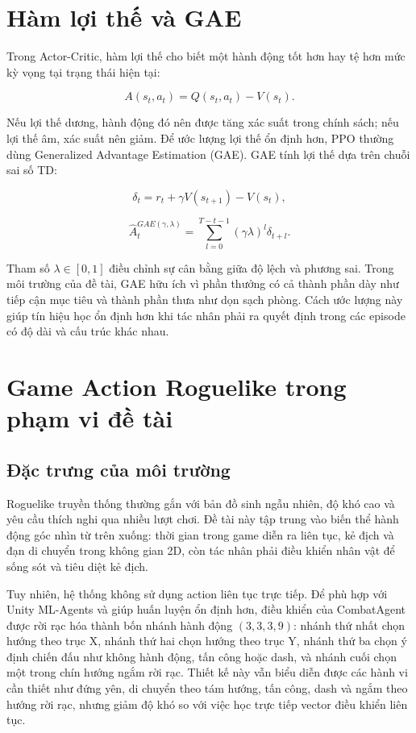 \section{Hàm lợi thế và GAE}

Trong Actor-Critic, hàm lợi thế cho biết một hành động tốt hơn hay tệ hơn mức kỳ vọng tại trạng thái hiện tại:

\begin{equation}
    A(s_t,a_t) = Q(s_t,a_t) - V(s_t).
\end{equation}

Nếu lợi thế dương, hành động đó nên được tăng xác suất trong chính sách; nếu lợi thế âm, xác suất nên giảm. Để ước lượng lợi thế ổn định hơn, PPO thường dùng Generalized Advantage Estimation (GAE). GAE tính lợi thế dựa trên chuỗi sai số TD:

\begin{equation}
    \delta_t = r_t + \gamma V(s_{t+1}) - V(s_t),
\end{equation}

\begin{equation} \label{eq:gae_formula}
    \hat{A}_t^{GAE(\gamma,\lambda)}
    =
    \sum_{l=0}^{T-t-1}(\gamma\lambda)^l \delta_{t+l}.
\end{equation}

Tham số $\lambda \in [0,1]$ điều chỉnh sự cân bằng giữa độ lệch và phương sai. Trong môi trường của đề tài, GAE hữu ích vì phần thưởng có cả thành phần dày như tiếp cận mục tiêu và thành phần thưa như dọn sạch phòng. Cách ước lượng này giúp tín hiệu học ổn định hơn khi tác nhân phải ra quyết định trong các episode có độ dài và cấu trúc khác nhau.

\section{Game Action Roguelike trong phạm vi đề tài}
\subsection{Đặc trưng của môi trường}

Roguelike truyền thống thường gắn với bản đồ sinh ngẫu nhiên, độ khó cao và yêu cầu thích nghi qua nhiều lượt chơi. Đề tài này tập trung vào biến thể hành động góc nhìn từ trên xuống: thời gian trong game diễn ra liên tục, kẻ địch và đạn di chuyển trong không gian 2D, còn tác nhân phải điều khiển nhân vật để sống sót và tiêu diệt kẻ địch.

Tuy nhiên, hệ thống không sử dụng action liên tục trực tiếp. Để phù hợp với Unity ML-Agents và giúp huấn luyện ổn định hơn, điều khiển của CombatAgent được rời rạc hóa thành bốn nhánh hành động $(3,3,3,9)$: nhánh thứ nhất chọn hướng theo trục X, nhánh thứ hai chọn hướng theo trục Y, nhánh thứ ba chọn ý định chiến đấu như không hành động, tấn công hoặc dash, và nhánh cuối chọn một trong chín hướng ngắm rời rạc. Thiết kế này vẫn biểu diễn được các hành vi cần thiết như đứng yên, di chuyển theo tám hướng, tấn công, dash và ngắm theo hướng rời rạc, nhưng giảm độ khó so với việc học trực tiếp vector điều khiển liên tục.

